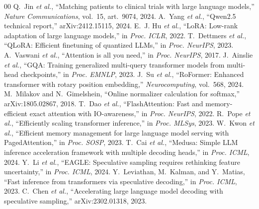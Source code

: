 \documentclass[conference]{IEEEtran}
\begin{document}
\begin{thebibliography}{00}
 Q.~Jin \emph{et al.}, ``Matching patients to clinical trials with large language models,'' \emph{Nature Communications}, vol.~15, art.~9074, 2024.
 A.~Yang \emph{et al.}, ``Qwen2.5 technical report,'' arXiv:2412.15115, 2024.
 E.~J. Hu \emph{et al.}, ``LoRA: Low-rank adaptation of large language models,'' in \emph{Proc. ICLR}, 2022.
 T.~Dettmers \emph{et al.}, ``QLoRA: Efficient finetuning of quantized LLMs,'' in \emph{Proc. NeurIPS}, 2023.
 A.~Vaswani \emph{et al.}, ``Attention is all you need,'' in \emph{Proc. NeurIPS}, 2017.
 J.~Ainslie \emph{et al.}, ``GQA: Training generalized multi-query transformer models from multi-head checkpoints,'' in \emph{Proc. EMNLP}, 2023.
 J.~Su \emph{et al.}, ``RoFormer: Enhanced transformer with rotary position embedding,'' \emph{Neurocomputing}, vol.~568, 2024.
 M.~Milakov and N.~Gimelshein, ``Online normalizer calculation for softmax,'' arXiv:1805.02867, 2018.
 T.~Dao \emph{et al.}, ``FlashAttention: Fast and memory-efficient exact attention with IO-awareness,'' in \emph{Proc. NeurIPS}, 2022.
 R.~Pope \emph{et al.}, ``Efficiently scaling transformer inference,'' in \emph{Proc. MLSys}, 2023.
 W.~Kwon \emph{et al.}, ``Efficient memory management for large language model serving with PagedAttention,'' in \emph{Proc. SOSP}, 2023.
 T.~Cai \emph{et al.}, ``Medusa: Simple LLM inference acceleration framework with multiple decoding heads,'' in \emph{Proc. ICML}, 2024.
 Y.~Li \emph{et al.}, ``EAGLE: Speculative sampling requires rethinking feature uncertainty,'' in \emph{Proc. ICML}, 2024.
 Y.~Leviathan, M.~Kalman, and Y.~Matias, ``Fast inference from transformers via speculative decoding,'' in \emph{Proc. ICML}, 2023.
 C.~Chen \emph{et al.}, ``Accelerating large language model decoding with speculative sampling,'' arXiv:2302.01318, 2023.
\end{thebibliography}
\end{document}
